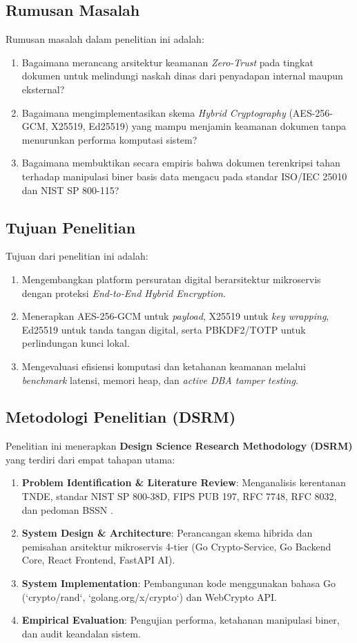 \documentclass[conference]{IEEEtran}
\begin{document}
\subsection{Rumusan Masalah}
Rumusan masalah dalam penelitian ini adalah:
\begin{enumerate}
    \item Bagaimana merancang arsitektur keamanan \textit{Zero-Trust} pada tingkat dokumen untuk melindungi naskah dinas dari penyadapan internal maupun eksternal?
    \item Bagaimana mengimplementasikan skema \textit{Hybrid Cryptography} (AES-256-GCM, X25519, Ed25519) yang mampu menjamin keamanan dokumen tanpa menurunkan performa komputasi sistem?
    \item Bagaimana membuktikan secara empiris bahwa dokumen terenkripsi tahan terhadap manipulasi biner basis data mengacu pada standar ISO/IEC 25010 dan NIST SP 800-115?
\end{enumerate}

\subsection{Tujuan Penelitian}
Tujuan dari penelitian ini adalah:
\begin{enumerate}
    \item Mengembangkan platform persuratan digital berarsitektur mikroservis dengan proteksi \textit{End-to-End Hybrid Encryption}.
    \item Menerapkan AES-256-GCM untuk \textit{payload}, X25519 untuk \textit{key wrapping}, Ed25519 untuk tanda tangan digital, serta PBKDF2/TOTP untuk perlindungan kunci lokal.
    \item Mengevaluasi efisiensi komputasi dan ketahanan keamanan melalui \textit{benchmark} latensi, memori heap, dan \textit{active DBA tamper testing}.
\end{enumerate}

\subsection{Metodologi Penelitian (DSRM)}
Penelitian ini menerapkan \textbf{Design Science Research Methodology (DSRM)} yang terdiri dari empat tahapan utama:
\begin{enumerate}
    \item \textbf{Problem Identification \& Literature Review}: Menganalisis kerentanan TNDE, standar NIST SP 800-38D, FIPS PUB 197, RFC 7748, RFC 8032, dan pedoman BSSN \cite{bssn2022spbe}.
    \item \textbf{System Design \& Architecture}: Perancangan skema hibrida dan pemisahan arsitektur mikroservis 4-tier (Go Crypto-Service, Go Backend Core, React Frontend, FastAPI AI).
    \item \textbf{System Implementation}: Pembangunan kode menggunakan bahasa Go (`crypto/rand`, `golang.org/x/crypto`) dan WebCrypto API.
    \item \textbf{Empirical Evaluation}: Pengujian performa, ketahanan manipulasi biner, dan audit keandalan sistem.
\end{enumerate}
\end{document}
